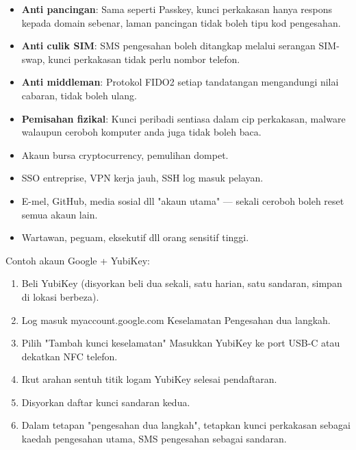
\begin{itemize}
  \item \textbf{Anti pancingan}: Sama seperti Passkey, kunci perkakasan hanya respons kepada domain sebenar, laman pancingan tidak boleh tipu kod pengesahan.
  \item \textbf{Anti culik SIM}: SMS pengesahan boleh ditangkap melalui serangan SIM-swap, kunci perkakasan tidak perlu nombor telefon.
  \item \textbf{Anti middleman}: Protokol FIDO2 setiap tandatangan mengandungi nilai cabaran, tidak boleh ulang.
  \item \textbf{Pemisahan fizikal}: Kunci peribadi sentiasa dalam cip perkakasan, malware walaupun ceroboh komputer anda juga tidak boleh baca.
\end{itemize}


\begin{itemize}
  \item Akaun bursa cryptocurrency, pemulihan dompet.
  \item SSO entreprise, VPN kerja jauh, SSH log masuk pelayan.
  \item E-mel, GitHub, media sosial dll "akaun utama" — sekali ceroboh boleh reset semua akaun lain.
  \item Wartawan, peguam, eksekutif dll orang sensitif tinggi.
\end{itemize}


Contoh akaun Google + YubiKey:

\begin{enumerate}
  \item Beli YubiKey (disyorkan beli dua sekali, satu harian, satu sandaran, simpan di lokasi berbeza).
  \item Log masuk myaccount.google.com Keselamatan Pengesahan dua langkah.
  \item Pilih "Tambah kunci keselamatan" Masukkan YubiKey ke port USB-C atau dekatkan NFC telefon.
  \item Ikut arahan sentuh titik logam YubiKey selesai pendaftaran.
  \item Disyorkan daftar kunci sandaran kedua.
  \item Dalam tetapan "pengesahan dua langkah", tetapkan kunci perkakasan sebagai kaedah pengesahan utama, SMS pengesahan sebagai sandaran.
\end{enumerate}

